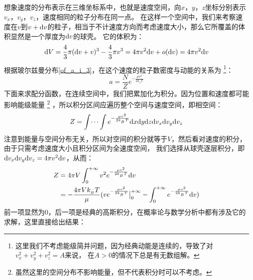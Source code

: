 \documentclass{Physics_H_Notes}
\begin{document}
        \begin{prove}            
            想象速度的分布表示在三维坐标系中，也就是速度空间，向$x$，$y$，$z$坐标分别表示$v_x$，$v_y$，$v_z$，速度相同的粒子分布在同一点。
            在这样一个空间中，我们来考察速度在$v$到$v+\mathrm{d}{v}$的粒子，相当于不计速度方向而考虑速度大小，那么它所覆盖的体积显然是一个厚度为$\mathrm{d}{v}$的球壳。
            它的体积为：
            \begin{equation}
                \mathrm{d}{V} = \frac{4}{3}\pi (\mathrm{d}{v}+v)^{3} - \frac{4}{3}\pi v^{3} = 4\pi v^{2}\mathrm{d}{v} + o(\mathrm{d}{v}) = 4\pi v^{2}\mathrm{d}{v}
            \end{equation}
            根据玻尔兹曼分布\ref{of_a_i_3}，在这个速度的粒子数密度与动能的关系为
            \footnote{这里我们不考虑能级简并问题，因为经典动能是连续的，导致了对$v_{x}^{2}+v_{y}^{2}+v_{z}^{2}=A$来说，
            在$A>0$的情况下总是有无数组解。}：
            \begin{equation}
                a= \frac{N}{Z} e^{-\frac{\mu v^{2}}{2k_{_B}T}}
            \end{equation}
            下面来求配分函数，在连续空间中，我们把累加化为积分。因为位置和速度都可能影响能级能量
            \footnote{虽然这里的空间分布不影响能量，但不代表积分时可以不考虑。}
            ，所以积分区间应遍历整个空间与速度空间，即相空间：
            \begin{equation}
                Z =\int \dots \int e^{-\frac{\mu v^{2}}{2k_{_B}T}} \mathrm{d}{x}\mathrm{d}{y}\mathrm{d}{z}\mathrm{d}{v_x}\mathrm{d}{v_y}\mathrm{d}{v_z}
            \end{equation}
            注意到能量与空间分布无关，所以对空间的积分就等于$V$，然后看对速度的积分，由于只需考虑速度大小且积分区间为全速度空间，
            我们选择从球壳逐层积分，即$\mathrm{d}{v_x}\mathrm{d}{v_y}\mathrm{d}{v_z} = 4\pi v^{2}\mathrm{d}{v}$，从而：
            \begin{equation}
                \begin{aligned}
                    Z &= 4\pi V\int_{0}^{+\infty} v^{2} e^{-\frac{\mu v^{2}}{2k_{_B}T}} \mathrm{d}{v}\\
                      &= -\frac{4 \pi V k_{_B}T}{\mu} (ve^{-\frac{\mu v^{2}}{2k_{_B}T}}\big|_{0}^{+\infty} - \int_{0}^{+\infty} e^{-\frac{\mu v^{2}}{2k_{_B}T}} \mathrm{d}{v})
                \end{aligned}
            \end{equation}
            前一项显然为0，后一项是经典的高斯积分，在概率论与数学分析中都有涉及它的求解，这里直接给出结果：
            \begin{equation}

\end{equation}
\end{prove}
\end{document}
